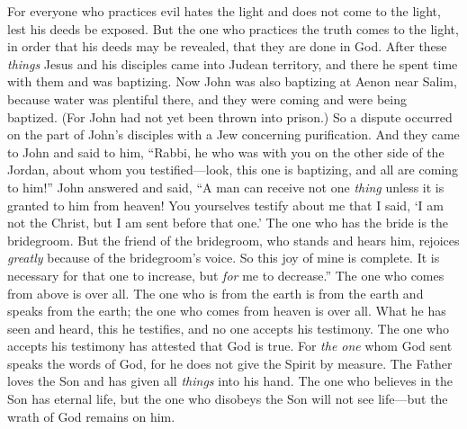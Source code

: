 \begin{biblechapter}
\verse For everyone who practices evil hates the light and does not come to the light, lest his deeds be exposed.
\verse But the one who practices the truth comes to the light, in order that his deeds may be revealed, that they are done in God.
 After these \textit{things} Jesus and his disciples came into Judean territory, and there he spent time with them and was baptizing.
\verse Now John was also baptizing at Aenon near Salim, because water was plentiful there, and they were coming and were being baptized.
\verse (For John had not yet been thrown into prison.)
\verse So a dispute occurred on the part of John’s disciples with a Jew concerning purification.
\verse And they came to John and said to him, “Rabbi, he who was with you on the other side of the Jordan, about whom you testified—look, this one is baptizing, and all are coming to him!”
\verse John answered and said, “A man can receive not one \textit{thing} unless it is granted to him from heaven!
\verse You yourselves testify about me that I said, ‘I am not the Christ, but I am sent before that one.’
\verse The one who has the bride is the bridegroom. But the friend of the bridegroom, who stands and hears him, rejoices \textit{greatly} because of the bridegroom’s voice. So this joy of mine is complete.
\verse It is necessary for that one to increase, but \textit{for} me to decrease.”
\verse The one who comes from above is over all. The one who is from the earth is from the earth and speaks from the earth; the one who comes from heaven is over all.
\verse What he has seen and heard, this he testifies, and no one accepts his testimony.
\verse The one who accepts his testimony has attested that God is true.
\verse For \textit{the one} whom God sent speaks the words of God, for he does not give the Spirit by measure.
\verse The Father loves the Son and has given all \textit{things} into his hand.
\verse The one who believes in the Son has eternal life, but the one who disobeys the Son will not see life—but the wrath of God remains on him.
\end{biblechapter}

